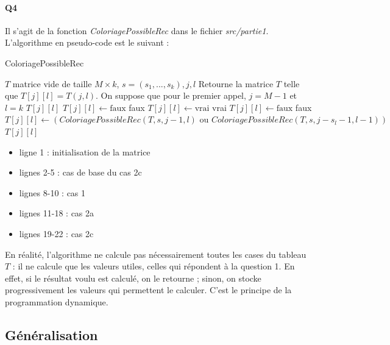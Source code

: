 \documentclass[12pt]{article}
\newcommand{\true}{\text{vrai}}
\newcommand{\false}{\text{faux}}
\begin{document}
	\paragraph{Q4}
	
	Il s'agit de la fonction \textit{ColoriagePossibleRec} dans le fichier \textit{src/partie1}. L'algorithme en pseudo-code est le suivant :
	\begin{algorithm} [H]
		\caption{ColoriagePossibleRec}
		\label{color_poss_rec}
		\begin{algorithmic}[1]
			\REQUIRE $T$ matrice vide de taille $ M \times k $, $ s=(s_1,...,s_k), j, l$ 
			\ENSURE Retourne la matrice $ T $ telle que $ T[j][l] = T(j,l) $. On suppose que pour le premier appel, $ j = M-1 $ et $ l = k $
			\RETURN $ T[j][l] $
			\STATE $ T[j][l] \leftarrow \false $
			\RETURN faux
			\STATE $ T[j][l] \leftarrow \true $
			\RETURN vrai
			\ELSE
			\STATE$ T[j][l] \leftarrow \false $
			\RETURN faux
			\ENDIF
			\ELSE
			\STATE $ T[j][l] \leftarrow (ColoriagePossibleRec(T,s,j-1,l) \text{ ou } ColoriagePossibleRec(T,s,j-s_l-1,l-1)) $
			\RETURN $ T[j][l] $
			\ENDIF\begin{flushleft}
				
			\end{flushleft}
		\end{algorithmic}
	\end{algorithm}
	
	\begin{itemize}
		\item ligne 1 : initialisation de la matrice
		\item lignes 2-5 : cas de base du cas 2c
		\item lignes 8-10 : cas 1
		\item lignes 11-18 : cas 2a
		\item lignes 19-22 : cas 2c
	\end{itemize}
	
	En réalité, l'algorithme ne calcule pas nécessairement toutes les cases du tableau $ T $ : il ne calcule que les valeurs utiles, celles qui répondent à la question 1. En effet, si le résultat voulu est calculé, on le retourne ; sinon, on stocke progressivement les valeurs qui permettent le calculer. C'est le principe de la programmation dynamique.
	
	\subsection{Généralisation}
	
\end{document}
